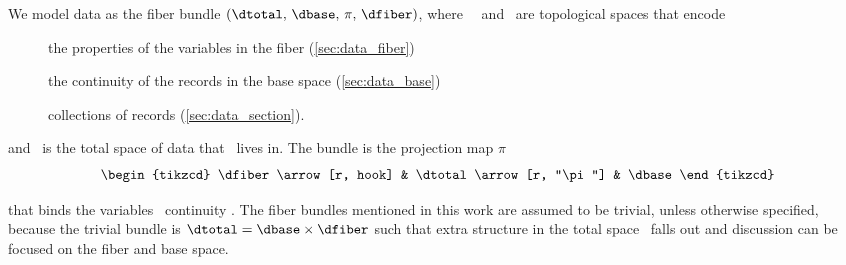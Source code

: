 \documentclass[../main.tex]{subfiles}
\begin{document}
We model data as the fiber bundle $(\dtotal,\,\dbase,\,\pi ,\,\dfiber)$, where \dtotal\, \dfiber\, and \dbase\ are topological spaces that encode 
\begin{description}
\item[\dfiber] the properties of the variables in the fiber (\ref{sec:data_fiber})
\item[\dbase] the continuity of the records in the base space (\ref{sec:data_base})
\item[\dsection] collections of records (\ref{sec:data_section}). 
\end{description}

and \dtotal\ is the total space of data that \dfiber\ lives in. The bundle is the projection map $\pi$
\begin{equation}
    \label{eq:fiber_bundle}
    \begin{tikzcd}
        \dfiber \arrow[r, hook] & \dtotal \arrow[r, "\pi"] & \dbase
    \end{tikzcd}
\end{equation}

that binds the variables \dfiber\ continuity \dbase. The fiber bundles mentioned in this work are assumed to be trivial\cite{spanier1989algebraic,LocallyTrivialFibre}, unless otherwise specified, because the trivial bundle is $\dtotal=\dbase\times \dfiber$ such that extra structure in the total space \dtotal\ falls out and discussion can be focused on the fiber and base space. 
\end{document}

